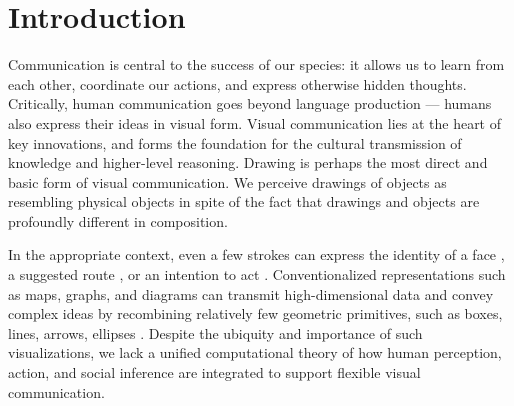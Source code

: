 \documentclass[manuscript]{stjour}
\begin{document}

\section*{Introduction}

Communication is central to the success of our species: it allows us to learn from each other, coordinate our actions, and express otherwise hidden thoughts. Critically, human communication goes beyond language production --- humans also express their ideas in visual form. Visual communication lies at the heart of key innovations, and forms the foundation for the cultural transmission of knowledge and higher-level reasoning. Drawing is perhaps the most direct and basic form of visual communication. We perceive drawings of objects as resembling physical objects in spite of the fact that drawings and objects are profoundly different in composition.

In the appropriate context, even a few strokes can express the identity of a face \cite[]{bergmann2013impact}, a suggested route \cite[]{agrawala2001rendering}, or an intention to act \cite[]{Galantucci:2005uh}. Conventionalized representations such as maps, graphs, and diagrams can transmit high-dimensional data and convey complex ideas by recombining relatively few geometric primitives, such as boxes, lines, arrows, ellipses \cite[]{tversky2000lines}. Despite the ubiquity and importance of such visualizations, we lack a unified computational theory of how human perception, action, and social inference are integrated to support flexible visual communication.
\end{document}
